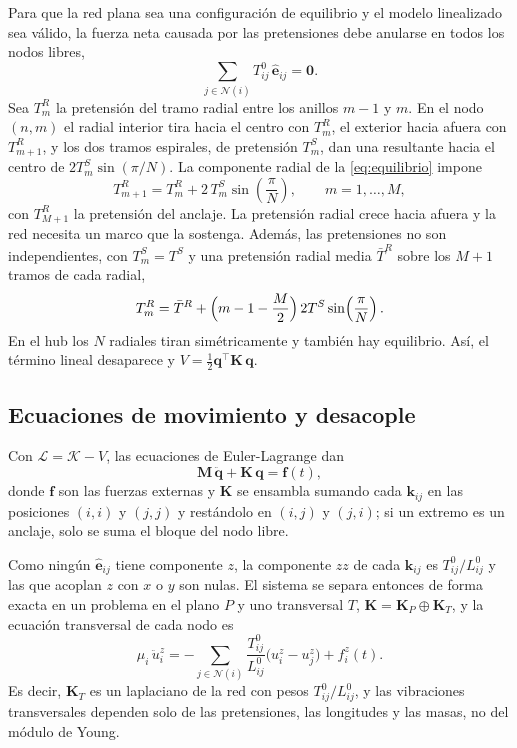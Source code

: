 \documentclass[fleqn,final]{jaes}
\begin{document}
Para que la red plana sea una configuración de equilibrio y el modelo
linealizado sea válido, la fuerza neta causada por las pretensiones debe anularse en todos los nodos libres,
\begin{equation}
  \sum_{j\in\mathcal{N}(i)}T^0_{ij}\,\hat{\mathbf{e}}_{ij}=\mathbf{0} .
  \label{eq:equilibrio}
\end{equation}
Sea $T^R_m$ la pretensión del tramo radial entre los anillos $m-1$ y $m$.
En el nodo $(n,m)$ el radial interior tira hacia el centro con $T^R_m$, el
exterior hacia afuera con $T^R_{m+1}$, y los dos tramos espirales, de
pretensión $T^S_m$, dan una resultante hacia el centro de
$2T^S_m\sin(\pi/N)$. La componente radial de la \cref{eq:equilibrio}
impone
\begin{equation}
  T^R_{m+1}=T^R_m+2\,T^S_m\sin\!\left(\frac{\pi}{N}\right),
  \qquad m=1,\dots,M,
  \label{eq:recurrencia}
\end{equation}
con $T^R_{M+1}$ la pretensión del anclaje. La pretensión radial crece
hacia afuera y la red necesita un marco que la sostenga. Además, las
pretensiones no son independientes, con $T^S_m=T^S$ y una pretensión
radial media $\bar T^R$ sobre los $M+1$ tramos de cada radial,
\begin{equation}
  T^R_m=\bar T^R+\Bigl(m-1-\frac{M}{2}\Bigr)\,2T^S\sin\!\left(\frac{\pi}{N}\right).
  \label{eq:TR}
\end{equation}
En el hub los $N$ radiales tiran simétricamente y también hay equilibrio.
Así, el término lineal desaparece y
$V=\frac12\mathbf{q}^{\top}\mathbf{K}\,\mathbf{q}$.

\subsection{Ecuaciones de movimiento y desacople}

Con $\mathcal{L}=\mathcal{K}-V$, las ecuaciones de Euler-Lagrange dan
\begin{equation}
  \mathbf{M}\,\ddot{\mathbf{q}}+\mathbf{K}\,\mathbf{q}=\mathbf{f}(t),
  \label{eq:sistema}
\end{equation}
donde $\mathbf{f}$ son las fuerzas externas y $\mathbf{K}$ se ensambla
sumando cada $\mathbf{k}_{ij}$ en las posiciones $(i,i)$ y $(j,j)$ y
restándolo en $(i,j)$ y $(j,i)$; si un extremo es un anclaje, solo se suma el bloque del nodo libre.

Como ningún $\hat{\mathbf{e}}_{ij}$ tiene componente $z$, la componente $zz$ de cada $\mathbf{k}_{ij}$ es $T^0_{ij}/L^0_{ij}$ y las que acoplan $z$ con $x$ o $y$ son nulas. El sistema se separa entonces de forma exacta en un problema en el plano $P$ y uno transversal $T$,
$\mathbf{K}=\mathbf{K}_P\oplus\mathbf{K}_T$, y la ecuación transversal de
cada nodo es
\begin{equation}
  \mu_i\,\ddot u^z_i=-\sum_{j\in\mathcal{N}(i)}
  \frac{T^0_{ij}}{L^0_{ij}}\bigl(u^z_i-u^z_j\bigr)+f^z_i(t).
  \label{eq:transversal}
\end{equation}
Es decir, $\mathbf{K}_T$ es un laplaciano de la red con pesos
$T^0_{ij}/L^0_{ij}$, y las vibraciones transversales dependen solo de las
pretensiones, las longitudes y las masas, no del módulo de Young.
\end{document}

